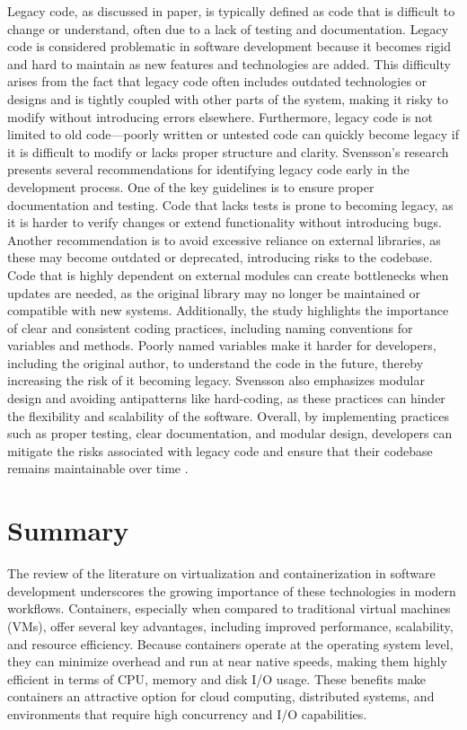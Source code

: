 Legacy code, as discussed in \citet{svenssonDefiningIdentifyingLegacy2018} paper, is typically defined as code that is difficult to change or understand, often due to a lack of testing and documentation.
Legacy code is considered problematic in software development because it becomes rigid and hard to maintain as new features and technologies are added.
This difficulty arises from the fact that legacy code often includes outdated technologies or designs and is tightly coupled with other parts of the system, making it risky to modify without introducing errors elsewhere.
Furthermore, legacy code is not limited to old code—poorly written or untested code can quickly become legacy if it is difficult to modify or lacks proper structure and clarity.
Svensson's research presents several recommendations for identifying legacy code early in the development process.
One of the key guidelines is to ensure proper documentation and testing.
Code that lacks tests is prone to becoming legacy, as it is harder to verify changes or extend functionality without introducing bugs.
Another recommendation is to avoid excessive reliance on external libraries, as these may become outdated or deprecated, introducing risks to the codebase.
Code that is highly dependent on external modules can create bottlenecks when updates are needed, as the original library may no longer be maintained or compatible with new systems.
Additionally, the study highlights the importance of clear and consistent coding practices, including naming conventions for variables and methods.
Poorly named variables make it harder for developers, including the original author, to understand the code in the future, thereby increasing the risk of it becoming legacy.
Svensson also emphasizes modular design and avoiding antipatterns like hard-coding, as these practices can hinder the flexibility and scalability of the software.
Overall, by implementing practices such as proper testing, clear documentation, and modular design, developers can mitigate the risks associated with legacy code and ensure that their codebase remains maintainable over time \citep{svenssonDefiningIdentifyingLegacy2018}.

\section{Summary}

The review of the literature on virtualization and containerization in software development underscores the growing importance of these technologies in modern workflows.
Containers, especially when compared to traditional virtual machines (VMs), offer several key advantages, including improved performance, scalability, and resource efficiency.
Because containers operate at the operating system level, they can minimize overhead and run at near native speeds, making them highly efficient in terms of CPU, memory and disk I/O usage.
These benefits make containers an attractive option for cloud computing, distributed systems, and environments that require high concurrency and I/O capabilities.

